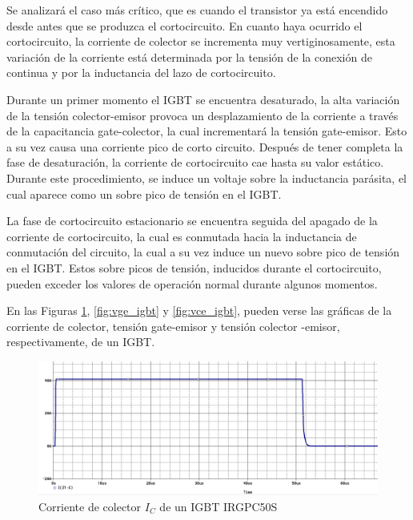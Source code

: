 \documentclass[conference]{IEEEtran}
\begin{document}
Se analizará el caso más crítico, que es cuando el transistor ya está encendido desde antes que se produzca el cortocircuito. En cuanto haya ocurrido el cortocircuito, la corriente de colector se incrementa muy vertiginosamente, esta variación de la corriente está determinada por la tensión de la conexión de continua y por la inductancia del lazo de cortocircuito.

Durante un primer momento el IGBT se encuentra desaturado, la alta variación de la tensión  colector-emisor provoca un desplazamiento de la corriente a través de la capacitancia gate-colector, la cual incrementará la tensión gate-emisor. Esto a su vez causa una corriente pico de corto circuito.
Después de tener completa la fase de desaturación, la corriente de cortocircuito cae hasta su valor estático. Durante este procedimiento, se induce un voltaje sobre la inductancia parásita, el cual aparece como un sobre pico de tensión en el IGBT. 

La fase de cortocircuito estacionario se encuentra seguida del apagado de la corriente de cortocircuito, la cual es conmutada hacia la inductancia de conmutación del circuito, la cual a su vez induce un nuevo sobre pico de tensión en el IGBT.
Estos sobre picos de tensión, inducidos durante el cortocircuito, pueden exceder los valores de operación normal durante algunos momentos. 

En las Figuras \ref{fig:ic_igbt}, \ref{fig:vge_igbt} y \ref{fig:vce_igbt}, pueden verse las gráficas de la corriente de colector, tensión gate-emisor y tensión colector -emisor, respectivamente, de un IGBT.


\begin{figure}[H]
	\centering
	\includegraphics[width=\columnwidth]{imagenes/ic_igbt}
	\caption{Corriente de colector $I_C$ de un IGBT IRGPC50S}
	\label{fig:ic_igbt}
\end{figure}
\end{document}
